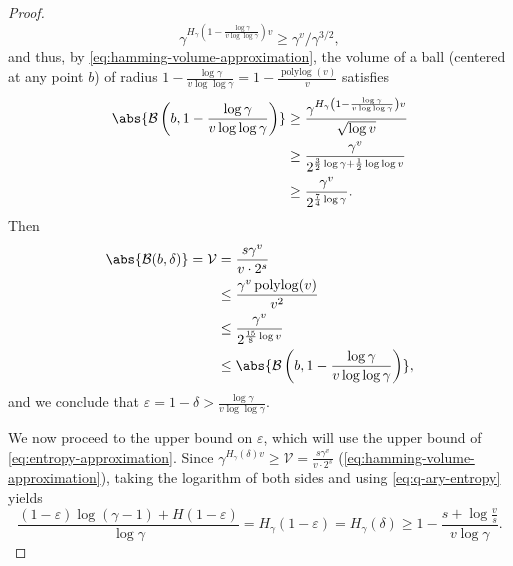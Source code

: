 \documentclass[a4paper,UKenglish,cleveref, autoref, thm-restate]{lipics-v2021}
\theoremstyle{definition}
\newcommand{\polylog}{\operatorname{polylog}}
\newcommand{\eps}{\varepsilon}
\newcommand{\vcommitlength}{v}
\newcommand{\ball}{\mathcal B}
\newcommand{\alphabetsize}{\gamma}
\begin{document}
\begin{proof}
    \begin{equation*}
        \alphabetsize^{H_\alphabetsize\left(1 - \frac{\log \alphabetsize}{\vcommitlength \log\log \alphabetsize}\right) \vcommitlength} \geq \alphabetsize^\vcommitlength/\alphabetsize^{3/2},
    \end{equation*}
    and thus, by \cref{eq:hamming-volume-approximation}, the volume of a ball (centered at any point $b$) of radius $1 - \frac{\log \alphabetsize}{\vcommitlength \log\log \alphabetsize} = 1 - \frac{\polylog(\vcommitlength)}{\vcommitlength}$ satisfies 
    \begin{align*}
        \abs{\ball\left(b, 1 - \frac{\log \alphabetsize}{\vcommitlength \log\log \alphabetsize}\right)} &\geq \frac{\alphabetsize^{H_\alphabetsize\left(1 - \frac{\log \alphabetsize}{\vcommitlength \log\log \alphabetsize}\right) \vcommitlength}}{\sqrt{\log \vcommitlength}}\\
        &\geq \frac{\alphabetsize^\vcommitlength}{2^{\frac{3}{2}\log \alphabetsize + \frac1 2 \log\log \vcommitlength}}\\
        &\geq \frac{\alphabetsize^\vcommitlength}{2^{\frac{7}{4}\log \alphabetsize}}.
    \end{align*}
    Then
    \begin{align*}
        \abs{\ball(b, \delta)} = \mathcal{V} &= \frac{s \alphabetsize^\vcommitlength}{\vcommitlength \cdot 2^s}\\
        &\leq \frac{\alphabetsize^\vcommitlength \polylog(\vcommitlength)}{\vcommitlength^2}\\
        &\leq \frac{\alphabetsize^\vcommitlength}{2^{\frac{15}{8}\log \vcommitlength}}\\
        &\leq \abs{\ball\left(b, 1 - \frac{\log \alphabetsize}{\vcommitlength \log\log \alphabetsize}\right)},
    \end{align*}
    and we conclude that $\eps = 1 - \delta > \frac{\log \alphabetsize}{\vcommitlength \log\log \alphabetsize}$.

    We now proceed to the upper bound on $\eps$, which will use the upper bound of \cref{eq:entropy-approximation}. Since  $\alphabetsize^{H_\alphabetsize(\delta) \vcommitlength} \geq \mathcal{V} = \frac{s \alphabetsize^\vcommitlength}{\vcommitlength \cdot 2^s}$ (\cref{eq:hamming-volume-approximation}), taking the logarithm of both sides and using \cref{eq:q-ary-entropy} yields
    \begin{equation}
        \label{eq:entropy-volume-inequality}
        \frac{(1 - \eps)\log(\alphabetsize - 1) + H(1 - \eps)}{\log \alphabetsize} = H_\alphabetsize(1 - \eps) = H_\alphabetsize(\delta) \geq 1 - \frac{s + \log \frac{\vcommitlength}{s}}{\vcommitlength \log \alphabetsize}.
    \end{equation}
    

\end{proof}
\end{document}
